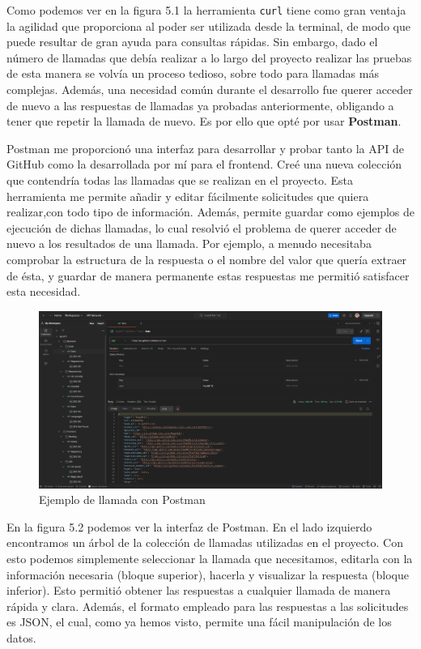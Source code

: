 \documentclass[a4paper, 12pt]{book}
\begin{document}
Como podemos ver en la figura 5.1 la herramienta \texttt{curl} tiene como gran ventaja la agilidad que proporciona al poder ser utilizada desde la terminal, de modo que puede resultar de gran ayuda para consultas rápidas. Sin embargo, dado el número de llamadas que debía realizar a lo largo del proyecto realizar las pruebas de esta manera se volvía un proceso tedioso, sobre todo para llamadas más complejas. Además, una necesidad común durante el desarrollo fue querer acceder de nuevo a las respuestas de llamadas ya probadas anteriormente, obligando a tener que repetir la llamada de nuevo. Es por ello que opté por usar \textbf{Postman}.

Postman me proporcionó una interfaz para desarrollar y probar tanto la API de GitHub como la desarrollada por mí para el frontend. Creé una nueva colección que contendría todas las llamadas que se realizan en el proyecto. Esta herramienta me permite añadir y editar fácilmente solicitudes que quiera realizar,con todo tipo de información. Además, permite guardar como ejemplos de ejecución de dichas llamadas, lo cual resolvió el problema de querer acceder de nuevo a los resultados de una llamada. Por ejemplo, a menudo necesitaba comprobar la estructura de la respuesta o el nombre del valor que quería extraer de ésta, y guardar de manera permanente estas respuestas me permitió satisfacer esta necesidad.

\vspace{2em}

\begin{figure}[H]
    \centering
    \includegraphics[width=\textwidth]{img/postman.png}
    \caption{Ejemplo de llamada con Postman}
    \label{fig:postman}
\end{figure}
\clearpage

En la figura 5.2 podemos ver la interfaz de Postman. En el lado izquierdo encontramos un árbol de la colección de llamadas utilizadas en el proyecto. Con esto podemos simplemente seleccionar la llamada que necesitamos, editarla con la información necesaria (bloque superior), hacerla y visualizar la respuesta (bloque inferior). Esto permitió obtener las respuestas a cualquier llamada de manera rápida y clara. Además, el formato empleado para las respuestas a las solicitudes es JSON, el cual, como ya hemos visto, permite una fácil manipulación de los datos.
\end{document}
